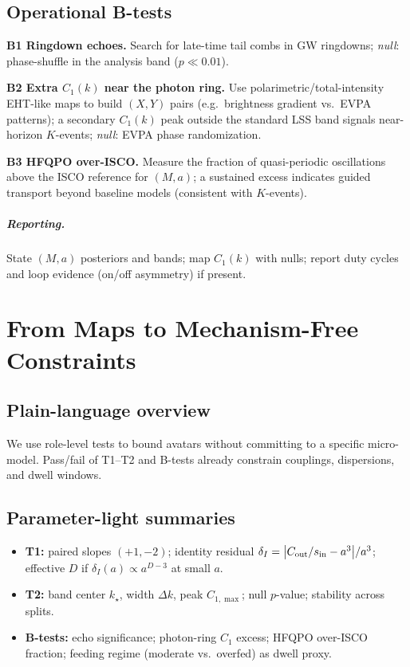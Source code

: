 \documentclass[12pt,a4paper,oneside]{scrreprt}
\begin{document}
\section{Operational B-tests}\label{sec:bh-tests}
\textbf{B1 Ringdown echoes.} 
Search for late-time tail combs in GW ringdowns; \emph{null}: phase-shuffle in the analysis band ($p\!\ll\!0.01$).

\textbf{B2 Extra $C_1(k)$ near the photon ring.} 
Use polarimetric/total-intensity EHT-like maps to build $(X,Y)$ pairs (e.g.\ brightness gradient vs.\ EVPA patterns); a secondary $C_1(k)$ peak outside the standard LSS band signals near-horizon $K$-events; \emph{null}: EVPA phase randomization.

\textbf{B3 HFQPO over-ISCO.} 
Measure the fraction of quasi-periodic oscillations above the ISCO reference for $(M,a)$; a sustained excess indicates guided transport beyond baseline models (consistent with $K$-events).

\paragraph{Reporting.}
State $(M,a)$ posteriors and bands; map $C_1(k)$ with nulls; report duty cycles and loop evidence (on/off asymmetry) if present.

\chapter{From Maps to Mechanism-Free Constraints}\label{ch:cosmos-constraints}

\section*{Plain-language overview}
We use role-level tests to bound avatars without committing to a specific micro-model. 
Pass/fail of T1–T2 and B-tests already constrain couplings, dispersions, and dwell windows.

\section{Parameter-light summaries}\label{sec:cosmos-summaries}
\begin{itemize}
\item \textbf{T1:} paired slopes $(+1,-2)$; identity residual $\delta_I=\big|C_{\rm out}/s_{\rm in}-a^3\big|/a^3$; effective $D$ if $\delta_I(a)\propto a^{D-3}$ at small $a$.
\item \textbf{T2:} band center $k_\star$, width $\Delta k$, peak $C_{1,\max}$; null $p$-value; stability across splits.
\item \textbf{B-tests:} echo significance; photon-ring $C_1$ excess; HFQPO over-ISCO fraction; feeding regime (moderate vs.\ overfed) as dwell proxy.
\end{itemize}
\end{document}
